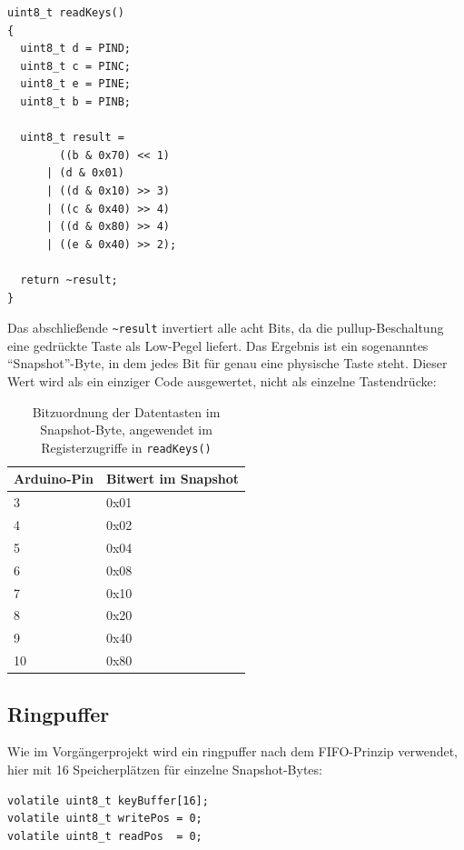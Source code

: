 \documentclass{article}
\begin{document}
\begin{lstlisting}[style=arduino]
uint8_t readKeys()
{
  uint8_t d = PIND;
  uint8_t c = PINC;
  uint8_t e = PINE;
  uint8_t b = PINB;

  uint8_t result =
        ((b & 0x70) << 1)
      | (d & 0x01)
      | ((d & 0x10) >> 3)
      | ((c & 0x40) >> 4)
      | ((d & 0x80) >> 4)
      | ((e & 0x40) >> 2);

  return ~result;
}
\end{lstlisting}

Das abschließende \texttt{\textasciitilde{}result} invertiert alle acht Bits, da die \gls{pullup}-Beschaltung eine gedrückte Taste als Low-Pegel liefert. Das Ergebnis ist ein sogenanntes \enquote{Snapshot}-Byte, in dem jedes Bit für genau eine physische Taste steht. Dieser Wert wird als ein einziger Code ausgewertet, nicht als einzelne Tastendrücke:

\begin{table}[ht]
\centering
\begin{tabular}{ll}
\toprule
\textbf{Arduino-Pin} & \textbf{Bitwert im Snapshot} \\
\midrule
3  & 0x01 \\
4  & 0x02 \\
5  & 0x04 \\
6  & 0x08 \\
7  & 0x10 \\
8  & 0x20 \\
9  & 0x40 \\
10 & 0x80 \\
\bottomrule
\end{tabular}
\caption{Bitzuordnung der Datentasten im Snapshot-Byte, angewendet im Registerzugriffe in \texttt{readKeys()}}
\end{table}
\FloatBarrier

\subsection{Ringpuffer}
\label{sec:ringpuffer}
Wie im Vorgängerprojekt wird ein \gls{ringpuffer} nach dem \gls{FIFO}-Prinzip verwendet, hier mit 16 Speicherplätzen für einzelne Snapshot-Bytes:

\begin{lstlisting}[style=arduino]
volatile uint8_t keyBuffer[16];
volatile uint8_t writePos = 0;
volatile uint8_t readPos  = 0;
\end{lstlisting}
\end{document}
